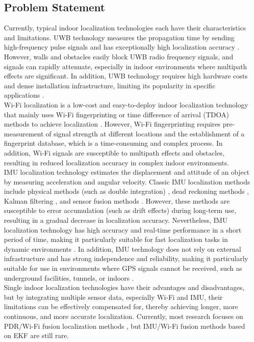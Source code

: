 \documentclass[12pt,a4paper]{article}
\numberwithin{equation}{section}
\begin{document}
\subsection{Problem Statement}
Currently, typical indoor localization technologies each have their characteristics and limitations. UWB technology measures the propagation time by sending high-frequency pulse signals and has exceptionally high localization accuracy \cite{fontana2004recent}. However, walls and obstacles easily block UWB radio frequency signals, and signals can rapidly attenuate, especially in indoor environments where multipath effects are significant. In addition, UWB technology requires high hardware costs and dense installation infrastructure, limiting its popularity in specific applications \cite{farahsari2022survey}.\\
Wi-Fi localization is a low-cost and easy-to-deploy indoor localization technology that mainly uses Wi-Fi fingerprinting or time difference of arrival (TDOA) methods to achieve localization \cite{yiu2017wireless,gustafsson2003positioning}. However, Wi-Fi fingerprinting requires pre-measurement of signal strength at different locations and the establishment of a fingerprint database, which is a time-consuming and complex process. In addition, Wi-Fi signals are susceptible to multipath effects and obstacles, resulting in reduced localization accuracy in complex indoor environments.\\
IMU localization technology estimates the displacement and attitude of an object by measuring acceleration and angular velocity. Classic IMU localization methods include physical methods (such as double integration) \cite{yan2018ridi}, dead reckoning methods \cite{jirawimut2003method}, Kalman filtering \cite{caron2006gps}, and sensor fusion methods \cite{dehzangi2017imu}. However, these methods are susceptible to error accumulation (such as drift effects) during long-term use, resulting in a gradual decrease in localization accuracy. Nevertheless, IMU localization technology has high accuracy and real-time performance in a short period of time, making it particularly suitable for fast localization tasks in dynamic environments \cite{marins2001improved}. In addition, IMU technology does not rely on external infrastructure and has strong independence and reliability, making it particularly suitable for use in environments where GPS signals cannot be received, such as underground facilities, tunnels, or indoors \cite{wu2015indoor}.\\
Single indoor localization technologies have their advantages and disadvantages, but by integrating multiple sensor data, especially Wi-Fi and IMU, their limitations can be effectively compensated for, thereby achieving longer, more continuous, and more accurate localization. Currently, most research focuses on PDR/Wi-Fi fusion localization methods \cite{liu2021kalman}, but IMU/Wi-Fi fusion methods based on EKF are still rare.
\end{document}
